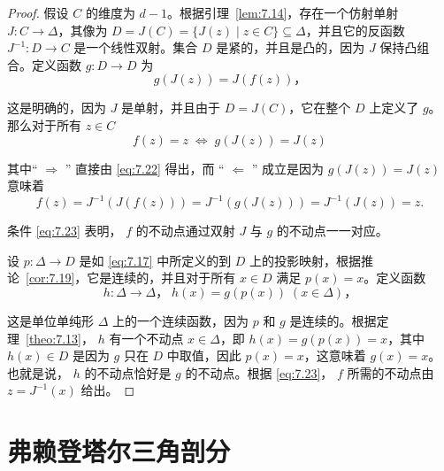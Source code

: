 \begin{proof}
假设 \(C\) 的维度为 \(d - 1\)。根据引理~\ref{lem:7.14}，存在一个仿射单射 \(J : C \rightarrow  \Delta\)，其像为 \(D = J\left( C\right)  = \{ J\left( z\right)  \mid  z \in  C\}  \subseteq  \Delta\)，并且它的反函数 \({J}^{-1} : D \rightarrow  C\) 是一个线性双射。集合 \(D\) 是紧的，并且是凸的，因为 \(J\) 保持凸组合。定义函数 \(g : D \rightarrow  D\) 为
\begin{equation}
g\left( {J\left( z\right) }\right)  = J\left( {f\left( z\right) }\right)，\label{eq:7.22}
\end{equation}

这是明确的，因为 \(J\) 是单射，并且由于 \(D = J\left( C\right)\)，它在整个 \(D\) 上定义了 \(g\)。那么对于所有 \(z \in  C\)
\begin{equation}
f\left( z\right)  = z\; \Leftrightarrow  \;g\left( {J\left( z\right) }\right)  = J\left( z\right)\label{eq:7.23}
\end{equation}

其中“ \(\Rightarrow\) ” 直接由 \eqref{eq:7.22} 得出，而 “ \(\Leftarrow\) ” 成立是因为 \(g\left( {J\left( z\right) }\right)  = J\left( z\right)\) 意味着
\[
f\left( z\right)  = {J}^{-1}\left( {J\left( {f\left( z\right) }\right) }\right)  = {J}^{-1}\left( {g\left( {J\left( z\right) }\right) }\right)  = {J}^{-1}\left( {J\left( z\right) }\right)  = z.
\]

条件 \eqref{eq:7.23} 表明， \(f\) 的不动点通过双射 \(J\) 与 \(g\) 的不动点一一对应。

设 \(p : \Delta  \rightarrow  D\) 是如 \eqref{eq:7.17} 中所定义的到 \(D\) 上的投影映射，根据推论~\ref{cor:7.19}，它是连续的，并且对于所有 \(x \in  D\) 满足 \(p\left( x\right)  = x\)。定义函数
\[
h : \Delta  \rightarrow  \Delta，\;h\left( x\right)  = g\left( {p\left( x\right) }\right) \;\left( {x \in  \Delta }\right)，
\]

这是单位单纯形 \(\Delta\) 上的一个连续函数，因为 \(p\) 和 \(g\) 是连续的。根据定理~\ref{theo:7.13}， \(h\) 有一个不动点 \(x \in  \Delta\)，即 \(h\left( x\right)  = g\left( {p\left( x\right) }\right)  = x\)，其中 \(h\left( x\right)  \in  D\) 是因为 \(g\) 只在 \(D\) 中取值，因此 \(p\left( x\right)  = x\)，这意味着 \(g\left( x\right)  = x\)。也就是说， \(h\) 的不动点恰好是 \(g\) 的不动点。根据 \eqref{eq:7.23}， \(f\) 所需的不动点由 \(z = {J}^{-1}\left( x\right)\) 给出。
\end{proof}

\section{弗赖登塔尔三角剖分}\label{sec-7.7}


